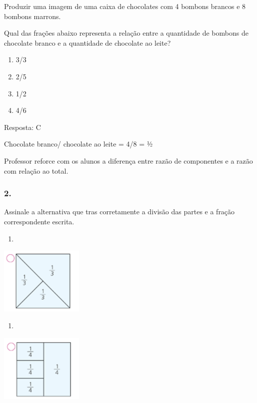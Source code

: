 Produzir uma imagem de uma caixa de chocolates com 4 bombons brancos e 8
bombons marrons.

Qual das frações abaixo representa a relação entre a quantidade de
bombons de chocolate branco e a quantidade de chocolate ao leite?

\begin{enumerate}
\def\labelenumi{\alph{enumi})}
\item
  3/3
\item
  2/5
\item
  1/2
\item
  4/6
\end{enumerate}

Resposta: C

Chocolate branco/ chocolate ao leite = 4/8 = ½

Professor reforce com os alunos a diferença entre razão de componentes e
a razão com relação ao total.

\subsubsection{2.}\label{section-115}

Assinale a alternativa que tras corretamente a divisão das partes e a
fração correspondente escrita.

\begin{enumerate}
\def\labelenumi{\alph{enumi})}
\item
\end{enumerate}

\includegraphics[width=1.55847in,height=1.26678in]{media/image123.png}

\begin{enumerate}
\def\labelenumi{\alph{enumi})}
\item
\end{enumerate}

\includegraphics[width=1.55847in,height=1.27511in]{media/image124.png}

